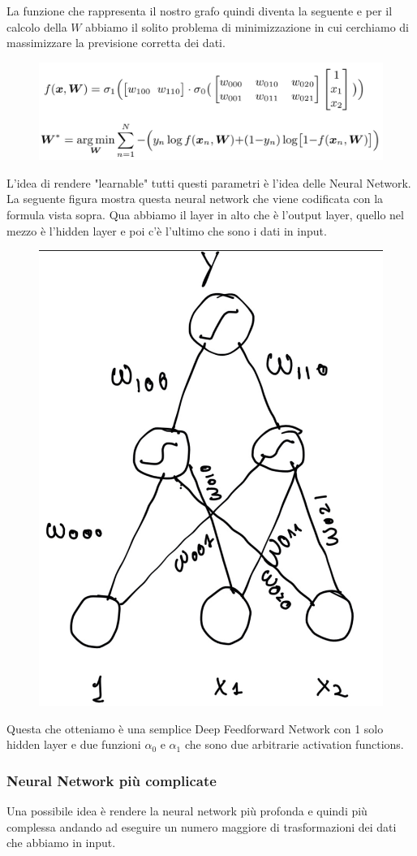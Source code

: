 \documentclass[14pt]{extreport}
\begin{document}
La funzione che rappresenta il nostro grafo quindi diventa la seguente e per il calcolo della $W$ abbiamo il solito problema di minimizzazione in cui
cerchiamo di massimizzare la previsione corretta dei dati.

\begin{figure}[H]
\centering
\includegraphics[width=0.9\linewidth]{366.jpeg}
\end{figure}

L'idea di rendere "learnable" tutti questi parametri è l'idea delle Neural Network. La seguente figura mostra questa neural network che viene
codificata con la formula vista sopra. Qua abbiamo il layer in alto che è l'output layer, quello nel mezzo è l'hidden layer e poi c'è l'ultimo che
sono i dati in input.

\begin{figure}[H]
\centering
\includegraphics[width=0.4\linewidth]{367.jpeg}
\end{figure}

Questa che otteniamo è una semplice Deep Feedforward Network con 1 solo hidden layer e due funzioni $\alpha_0$ e $\alpha_1$ che sono due arbitrarie
activation functions.


\subsubsection{Neural Network più complicate}

Una possibile idea è rendere la neural network più profonda e quindi più complessa andando ad eseguire un numero maggiore di trasformazioni dei dati
che abbiamo in input.
\end{document}
